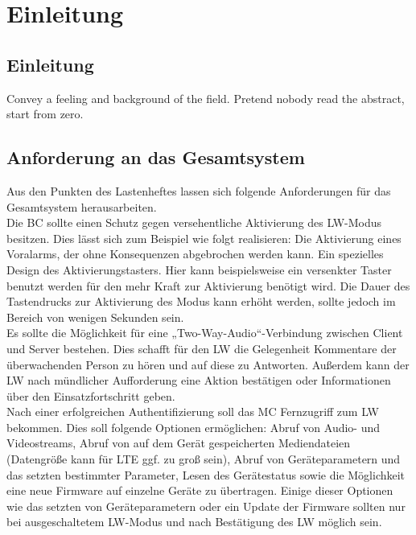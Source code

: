\documentclass[thesis.tex]{subfiles}
\begin{document}
\chapter{Einleitung}
\label{chap:Einleitung}


\section{Einleitung}
Convey a feeling and background of the field. Pretend nobody read the abstract, start from zero.

\section{Anforderung an das Gesamtsystem}
Aus den Punkten des Lastenheftes lassen sich folgende Anforderungen für das Gesamtsystem herausarbeiten.
\\

Die BC sollte einen Schutz gegen versehentliche Aktivierung des LW-Modus besitzen.
Dies lässt sich zum Beispiel wie folgt realisieren: Die Aktivierung eines Voralarms, der ohne Konsequenzen abgebrochen werden kann.
Ein spezielles Design des Aktivierungstasters. Hier kann beispielsweise ein versenkter Taster benutzt werden für den mehr Kraft zur
Aktivierung benötigt wird.
Die Dauer des Tastendrucks zur Aktivierung des Modus kann erhöht werden, sollte jedoch im Bereich von wenigen Sekunden sein.
\\

Es sollte die Möglichkeit für eine „Two-Way-Audio“-Verbindung zwischen Client und Server bestehen.
Dies schafft für den LW die Gelegenheit Kommentare der überwachenden Person zu hören und auf diese zu Antworten.
Außerdem kann der LW nach mündlicher Aufforderung eine Aktion bestätigen oder Informationen über den Einsatzfortschritt geben.
\\

Nach einer erfolgreichen Authentifizierung soll das MC Fernzugriff zum LW bekommen.
Dies soll folgende Optionen ermöglichen: Abruf von Audio- und Videostreams, Abruf von auf dem Gerät gespeicherten Mediendateien
(Datengröße kann für LTE ggf. zu groß sein), Abruf von Geräteparametern und das setzten bestimmter Parameter, Lesen des Gerätestatus
sowie die Möglichkeit eine neue Firmware auf einzelne Geräte zu übertragen.
Einige dieser Optionen wie das setzten von Geräteparametern oder ein Update der Firmware sollten nur bei ausgeschaltetem LW-Modus
und nach Bestätigung des LW möglich sein.
\\
\end{document}
